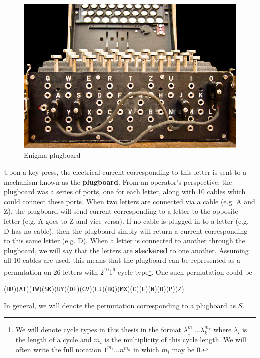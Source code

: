 \begin{figure}[htbp]
  \begin{center}\includegraphics[scale=1.2]{paper/images/plugboard.jpg}
  \end{center}
  \label{ref:plugboard}
  \caption{Enigma plugboard}
\end{figure}
\noindent Upon a key press, the electrical current corresponding to this letter
is sent to a mechanism known as the {\bf{plugboard}}. From an operator's
perspective, the plugboard was a series of ports, one for each
letter, along with 10 cables which could connect these ports. When
two letters are connected via a cable (e.g. A and Z), the plugboard
will send current corresponding to a letter to the opposite letter
(e.g. A goes to Z and vice versa). If no cable is plugged in to a
letter (e.g. D has no cable), then the plugboard simply will return a
current corresponding to this same letter (e.g. D). When a letter is
connected to another
through the plugboard, we will say that the letters are
{\bf{steckered}} to one another. Assuming all 10
cables are used, this means that the plugboard can be represented as a
permutation on 26 letters with $2^{10}1^6$ cycle type\footnote{We
  will denote cycle types in this thesis in the format
  $\lambda_1^{m_1}\dots\lambda_k^{m_k}$ where $\lambda_i$ is the length
  of a cycle and $m_i$ is the multiplicity of this cycle length. We
  will often write the full notation $1^{m_1}\dots n^{m_n}$ in which
$m_i$ may be $0$.}. One such
permutation could be
\begin{center}
  (\texttt{HR})(\texttt{AT})(\texttt{IW})(\texttt{SK})(\texttt{UY})(\texttt{DF})(\texttt{GV})(\texttt{LJ})(\texttt{BQ})(\texttt{MX})(\texttt{C})(\texttt{E})(\texttt{N})(\texttt{O})(\texttt{P})(\texttt{Z}).
\end{center}
In general, we will denote the permutation corresponding to a plugboard as $S$.


